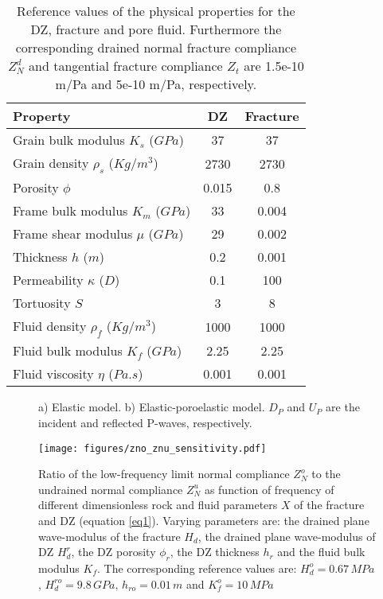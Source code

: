 \documentclass[draft,jgrga]{agutexSI2019}
\begin{document}
\begin{table}[!ht]
\begin{center}
  \begin{tabular}{ | l | c | c| }
    \hline
    Property & DZ & Fracture \\ \hline
    Grain bulk modulus $K_s$ ($GPa$) & 37 & 37 \\ 
    Grain density $\rho_s$ ($Kg/m^3$) & 2730 & 2730 \\
    Porosity $\phi$ & 0.015 & 0.8 \\
    Frame bulk modulus $K_m$ ($GPa$) & 33 & 0.004\\ 
    Frame shear modulus $\mu$ ($GPa$) & 29 & 0.002 \\
    Thickness $h$ ($m$) & 0.2 & 0.001\\ 
    Permeability $\kappa$ ($D$) & 0.1 & 100\\
    Tortuosity $S$ & 3 & 8\\
    Fluid density $\rho_f$ ($Kg/m^3$) & 1000 & 1000\\
    Fluid bulk modulus $K_f$ ($GPa$) & 2.25 & 2.25\\
    Fluid viscosity $\eta$ ($Pa.s$)& 0.001 & 0.001\\
    \hline
  \end{tabular}
  \caption{Reference values of the physical properties for the DZ, fracture and pore fluid. Furthermore the corresponding drained normal fracture compliance $Z_N^d $ and tangential fracture compliance $Z_t$ are 1.5e-10 m/Pa and 5e-10 m/Pa, respectively.}
  \label{table:1}
\end{center}
\end{table}

 \begin{figure}[!ht]
\centering
{}
        
    
\caption{ a) Elastic model. b) Elastic-poroelastic model. $D_P$ and $U_P$ are the incident and reflected P-waves, respectively. }
\label{fig:1}
\end{figure}

 \begin{figure}[!ht]
\centering
        \texttt{[image: figures/zno\_znu\_sensitivity.pdf]}
\caption {Ratio of the low-frequency limit normal compliance $Z_N^o$ to the undrained normal compliance $Z_N^u$ as function of frequency of different dimensionless rock and fluid parameters $X$ of the fracture and DZ (equation \ref{eq1}). Varying parameters are: the drained plane wave-modulus of the fracture $H_d$, the drained plane wave-modulus of DZ $H_d^r$, the DZ porosity $\phi_r$, the DZ thickness $h_r$ and the fluid bulk modulus $K_f$. The corresponding reference values are: $H_d^o =0.67\, MPa$, $H_d^{ro} =9.8 \,GPa$, $h_{ro}=0.01\, m$ and $K_f^o= 10 \,MPa$}
\label{fig:2}
\end{figure}
\end{document}
